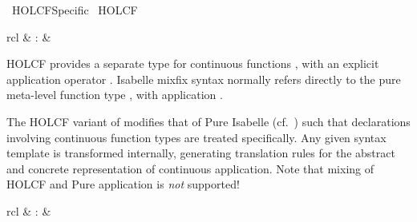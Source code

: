 %
\begin{isabellebody}%
\def\isabellecontext{HOLCF{\isaliteral{5F}{\isacharunderscore}}Specific}%
%
\isadelimtheory
%
\endisadelimtheory
%
\isatagtheory
{}\isamarkupfalse%
\ HOLCF{}Specific\isanewline
{}\ HOLCF\isanewline
{}%
\endisatagtheory
{\isafoldtheory}%
%
\isadelimtheory
%
\endisadelimtheory
%
\isamarkuptrue%
%
\isamarkuptrue%
%
\begin{isamarkuptext}%
\begin{matharray}{rcl}
    \hypertarget{command.HOLCF.consts}{\hyperlink{command.HOLCF.consts}{\mbox{}}} & : &  \\
  \end{matharray}

  HOLCF provides a separate type for continuous functions , with an explicit application operator .
  Isabelle mixfix syntax normally refers directly to the pure
  meta-level function type , with application .

  The HOLCF variant of \hyperlink{command.HOLCF.consts}{\mbox{}} modifies that of
  Pure Isabelle (cf.\ ) such that declarations
  involving continuous function types are treated specifically.  Any
  given syntax template is transformed internally, generating
  translation rules for the abstract and concrete representation of
  continuous application.  Note that mixing of HOLCF and Pure
  application is \emph{not} supported!%
\end{isamarkuptext}%
\isamarkuptrue%
%
\isamarkuptrue%
%
\begin{isamarkuptext}%
\begin{matharray}{rcl}
    \hypertarget{command.HOLCF.domain}{\hyperlink{command.HOLCF.domain}{\mbox{}}} & : &  \\
  \end{matharray}


\end{isamarkuptext}
\end{isabellebody}
